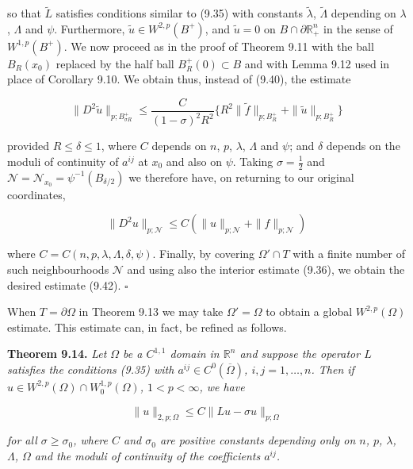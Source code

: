 so that $\tilde{L}$ satisfies conditions similar to (9.35) with constants $\tilde{\lambda}$, $\tilde{\Lambda}$ depending on $\lambda$, $\Lambda$ and $\psi$. Furthermore, $\tilde{u} \in W^{2,p}(B^+)$, and $\tilde{u}=0$ on $B\cap \partial\mathbb{R}^n_+$ in the sense of $W^{1,p}(B^+)$. We now proceed as in the proof of Theorem 9.11 with the ball $B_R(x_0)$ replaced by the half ball $B_R^+(0) \subset B$ and with Lemma 9.12 used in place of Corollary 9.10. We obtain thus, instead of (9.40), the estimate

\[
\|D^2\tilde{u}\|_{p;B_{\sigma R}^+} \le \frac{C}{(1-\sigma)^2R^2}\{R^2\|\tilde{f}\|_{p;B_R^+}+\|\tilde{u}\|_{p;B_R^+}\}
\]

provided $R \le \delta \le 1$, where $C$ depends on $n$, $p$, $\lambda$, $\Lambda$ and $\psi$; and $\delta$ depends on the moduli of continuity of $a^{ij}$ at $x_0$ and also on $\psi$. Taking $\sigma=\frac12$ and $\mathcal{N}=\mathcal{N}_{x_0}=\psi^{-1}(B_{\delta/2})$ we therefore have, on returning to our original coordinates,

\[
\|D^2u\|_{p;\mathcal{N}} \le C(\|u\|_{p;\mathcal{N}}+\|f\|_{p;\mathcal{N}})
\]

where $C=C(n,p,\lambda,\Lambda,\delta,\psi)$. Finally, by covering $\Omega' \cap T$ with a finite number of such neighbourhoods $\mathcal{N}$ and using also the interior estimate (9.36), we obtain the desired estimate (9.42). $\square$



\noindent When $T=\partial \Omega$ in Theorem 9.13 we may take $\Omega'=\Omega$ to obtain a global $W^{2,p}(\Omega)$ estimate. This estimate can, in fact, be refined as follows.

\textbf{Theorem 9.14.} \textit{Let $\Omega$ be a $C^{1,1}$ domain in $\mathbb{R}^n$ and suppose the operator $L$ satisfies the conditions (9.35) with $a^{ij}\in C^{0}(\overline{\Omega})$, $i, j = 1, \ldots, n$. Then if $u \in W^{2,p}(\Omega) \cap W^{1,p}_0(\Omega)$, $1 < p < \infty$, we have}

\begin{equation}
\tag{9.43}
\|u\|_{2,p;\Omega} \le C\|Lu - \sigma u\|_{p;\Omega}
\end{equation}

\noindent \textit{for all $\sigma \ge \sigma_0$, where $C$ and $\sigma_0$ are positive constants depending only on $n$, $p$, $\lambda$, $\Lambda$, $\Omega$ and the moduli of continuity of the coefficients $a^{ij}$.}

